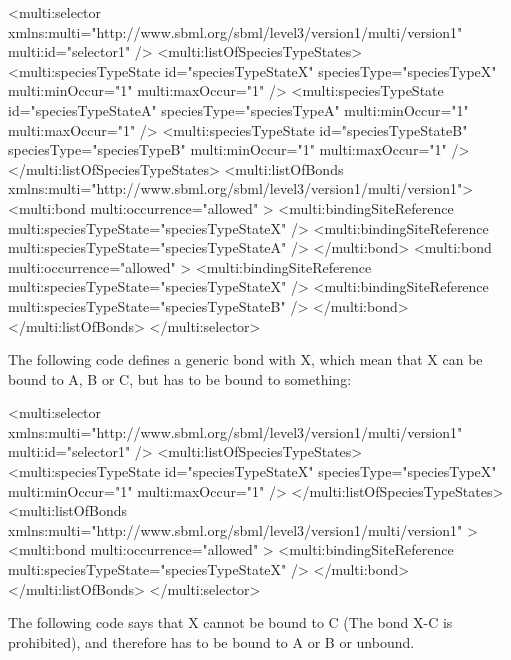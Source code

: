 \begin{example}
<multi:selector xmlns:multi="http://www.sbml.org/sbml/level3/version1/multi/version1" 
                multi:id="selector1" />
  <multi:listOfSpeciesTypeStates>
    <multi:speciesTypeState id="speciesTypeStateX" speciesType="speciesTypeX"                                           
                            multi:minOccur="1" multi:maxOccur="1" />
    <multi:speciesTypeState id="speciesTypeStateA" speciesType="speciesTypeA"                           
                            multi:minOccur="1" multi:maxOccur="1" />
    <multi:speciesTypeState id="speciesTypeStateB" speciesType="speciesTypeB"                           
                            multi:minOccur="1" multi:maxOccur="1" />
  </multi:listOfSpeciesTypeStates>
  <multi:listOfBonds xmlns:multi="http://www.sbml.org/sbml/level3/version1/multi/version1">
    <multi:bond multi:occurrence="allowed" >
      <multi:bindingSiteReference multi:speciesTypeState="speciesTypeStateX" />
      <multi:bindingSiteReference multi:speciesTypeState="speciesTypeStateA" />
    </multi:bond>
    <multi:bond multi:occurrence="allowed" >
      <multi:bindingSiteReference multi:speciesTypeState="speciesTypeStateX" />
      <multi:bindingSiteReference multi:speciesTypeState="speciesTypeStateB" />
    </multi:bond>
  </multi:listOfBonds>
</multi:selector> 
\end{example}

The following code defines a generic bond with X, which mean that X can be bound to A, B or C, but has to be bound to something:

\begin{example}
<multi:selector xmlns:multi="http://www.sbml.org/sbml/level3/version1/multi/version1" 
                multi:id="selector1" />
  <multi:listOfSpeciesTypeStates>
    <multi:speciesTypeState id="speciesTypeStateX" speciesType="speciesTypeX"                                           
                            multi:minOccur="1" multi:maxOccur="1" />
  </multi:listOfSpeciesTypeStates>
  <multi:listOfBonds xmlns:multi="http://www.sbml.org/sbml/level3/version1/multi/version1" >
    <multi:bond multi:occurrence="allowed" >
      <multi:bindingSiteReference multi:speciesTypeState="speciesTypeStateX" />
    </multi:bond>
  </multi:listOfBonds>
</multi:selector> 
\end{example}

The following code says that X cannot be bound to C (The bond X-C is prohibited), and therefore has to be bound to A or B or unbound.


